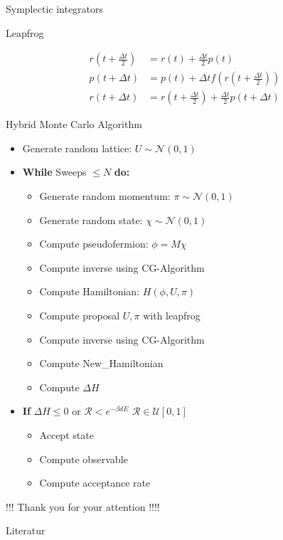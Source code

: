 \documentclass[10pt]{beamer}
\begin{document}
\begin{frame}{Symplectic integrators}
    \begin{center} Leapfrog \end{center}
    \begin{align}
        r(t+\frac{\Delta t}{2}) &= r(t) + \frac{\Delta t}{2} p(t) \\
        p(t+\Delta t) &= p(t) +\Delta t f\left(r(t+\frac{\Delta t}{2})\right) \\
        r(t+\Delta t) &= r(t+\frac{\Delta t}{2}) + \frac{\Delta t}{2}p(t+\Delta t)
    \end{align}
    
\end{frame}


\begin{frame}{Hybrid Monte Carlo Algorithm}
    \begin{itemize}
       \item Generate random lattice: $U \sim \mathcal{N}(0,1)  $
       \item \textbf{While} Sweeps $\leq  N $ \textbf{do:}
        \begin{itemize}
            \item Generate random momentum: $\pi \sim \mathcal{N}(0,1) $
            \item Generate random state: $\chi \sim \mathcal{N}(0,1) $
            \item Compute pseudofermion: $\phi = M \chi $
            \item Compute inverse using CG-Algorithm
            \item Compute Hamiltonian: $H(\phi,U,\pi)$
            \item Compute proposal $U,\pi$ with leapfrog
            \item Compute inverse using CG-Algorithm
            \item Compute New\_Hamiltonian
            \item Compute $\Delta H$
       \end{itemize}
       \item \textbf{If} $\Delta H \leq 0$ or $\mathcal{R}< e^{-\beta dE}$                                 $\mathcal{R} \in \mathcal{U}[0,1]$
        \begin{itemize}
            \item Accept state 
            \item Compute observable
            \item Compute acceptance rate
        \end{itemize}
    \end{itemize}
\end{frame}
        


\begin{frame}
    \begin{center}
        !!! Thank you for your attention !!!!
    \end{center}
        
\end{frame}

\begin{frame}{Literatur}
    \printbibliography
\end{frame}
\end{document}
